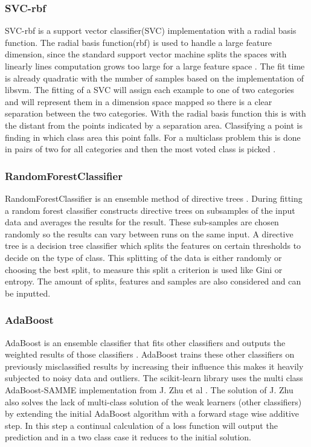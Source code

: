 \documentclass[a4paper,10pt]{article}
\begin{document}
\subsubsection{SVC-rbf}
SVC-rbf is a support vector classifier(SVC) implementation with a radial basis function. The radial basis function(rbf) is used to handle a large feature dimension, since the standard support vector machine splits the spaces with linearly lines computation grows too large for a large feature space \cite{SVN}. The fit time is already quadratic with the number of samples based on the implementation of libsvm\cite{SVM}. The fitting of a SVC will assign each example to one of two categories and will represent them in a dimension space mapped so there is a clear separation between the two categories. With the radial basis function this is with the distant from the points indicated by a separation area. Classifying a point is finding in which class area this point falls. For a multiclass problem this is done in pairs of two for all categories and then the most voted class is picked \cite{Multi-pair-coup}.%

\subsubsection{RandomForestClassifier}
RandomForestClassifier is an ensemble method of directive trees \cite{RDF}. During fitting a random forest classifier constructs directive trees on subsamples of the input data and averages the results for the result. These sub-samples are chosen randomly so the results can vary between runs on the same input. A directive tree is a decision tree classifier which splits the features on certain thresholds to decide on the type of class. This splitting of the data is either randomly or choosing the best split, to measure this split a criterion is used like Gini or entropy. The amount of splits, features and samples are also considered and can be inputted. 

\subsubsection{AdaBoost}
AdaBoost is an ensemble classifier that fits other classifiers and outputs the weighted results of those classifiers \cite{AdaBoost}. AdaBoost trains these other classifiers on previously misclassified results by increasing their influence this makes it heavily subjected to noisy data and outliers. The scikit-learn library uses the multi class AdaBoost-SAMME implementation from J. Zhu et al \cite{MadaB}. The solution of J. Zhu also solves the lack of multi-class solution of the weak learners (other classifiers) by extending the initial AdaBoost algorithm with a forward stage wise additive step. In this step a continual calculation of a loss function will output the prediction and in a two class case it reduces to the initial solution.
\end{document}

